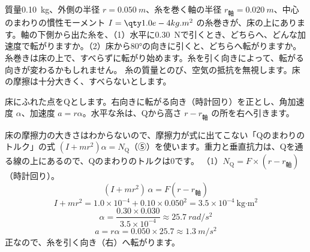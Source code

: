 \begin{phreidai}\label{ph:力-7:ex4}
質量\qty{0.10}{kg}、外側の半径 $r=\qty{0.050}{m}$、糸を巻く軸の半径 $r_{\text{軸}}=\qty{0.020}{m}$、中心のまわりの慣性モーメント $I=\pxhI{1.0e-4}$ の糸巻きが、床の上にあります。軸の下側から出た糸を、（1）水平に\qty{0.30}{N}で引くとき、どちらへ、どんな加速度で転がりますか。（2）床から\ang{80}の向きに引くと、どちらへ転がりますか。
\phbamen
糸巻きは床の上で、すべらずに転がり始めます。糸を引く向きによって、転がる向きが変わるかもしれません。
\phmushi
糸の質量とのび、空気の抵抗を無視します。床の摩擦は十分大きく、すべらないとします。
\phzu
\noindent\begin{minipage}[c]{0.4\linewidth}\centering
{}
\end{minipage}\hfill
\begin{minipage}[c]{0.58\linewidth}
床にふれた点をQとします。右向きに転がる向き（時計回り）を正とし、角加速度 $\alpha$、加速度 $a=r\alpha$。水平な糸は、Qから高さ $r-r_{\text{軸}}$ の所を右へ引きます。
\end{minipage}
\phriyu
床の摩擦力の大きさはわからないので、摩擦力が式に出てこない「Qのまわりのトルク」の式 $(I+mr^2)\alpha=N_\mathrm{Q}$（⑤）を使います。重力と垂直抗力は、Qを通る線の上にあるので、Qのまわりのトルクは0です。
\phtateru
（1）$N_\mathrm{Q}=F\times(r-r_{\text{軸}})$（時計回り）。
\[(I+mr^2)\,\alpha=F(r-r_{\text{軸}})\]
\phtoku
\[I+mr^2=1.0\times10^{-4}+0.10\times0.050^2=3.5\times10^{-4}\ \text{kg·m}^2\]
\[\alpha=\frac{0.30\times0.030}{3.5\times10^{-4}}\approx\qty{25.7}{rad/s^2}\]
\[a=r\alpha=0.050\times25.7\approx\qty{1.3}{m/s^2}\]
正なので、糸を引く向き（右）へ転がります。\\

\end{phreidai}
